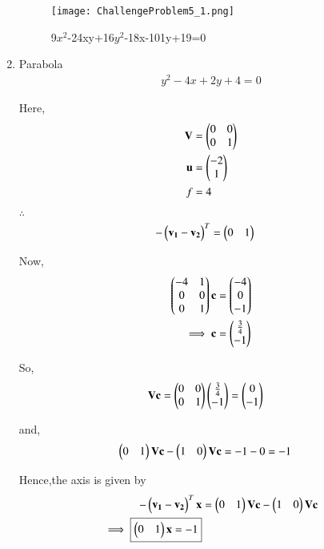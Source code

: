 \documentclass[journal,12pt,twocolumn]{IEEEtran}
\begin{document}
\begin{enumerate}
    \begin{figure}[!ht]
    \centering
    \texttt{[image: ChallengeProblem5\_1.png]}
    \caption{9$x^2$-24xy+16$y^2$-18x-101y+19=0}
    \label{ex1}	
    \end{figure}
    
    \item Parabola
    \begin{align}
    y^2-4x+2y+4 = 0
    \end{align}
    
    Here,
    \begin{align}
    \mathbf{V} &= \begin{pmatrix}0 & 0 \\ 0 & 1\end{pmatrix} \\
    \mathbf{u} &= \begin{pmatrix}-2 \\ 1\end{pmatrix} \\
    f &= 4
    \end{align}

    $\therefore$
    \begin{align}
    -\begin{pmatrix}\mathbf{v_1}-\mathbf{v_2}\end{pmatrix}^T &= \begin{pmatrix}0 & 1\end{pmatrix}
    \end{align}

    Now,
    \begin{align}
    \begin{pmatrix}-4 & 1 \\ 0 & 0 \\ 0 & 1\end{pmatrix}\mathbf{c} &= \begin{pmatrix}-4 \\ 0 \\ -1\end{pmatrix}
    \\
    \implies \mathbf{c} &= \begin{pmatrix}\frac{3}{4} \\ -1\end{pmatrix}
    \end{align}

    So,
    \begin{align}
    \mathbf{V}\mathbf{c} &= \begin{pmatrix}0 & 0 \\ 0 & 1\end{pmatrix}\begin{pmatrix}\frac{3}{4} \\ -1\end{pmatrix}=\begin{pmatrix}0 \\ -1\end{pmatrix}
    \end{align}

    and,
    \begin{align}
    \begin{pmatrix}0 & 1\end{pmatrix}\mathbf{V}\mathbf{c} - \begin{pmatrix}1&0\end{pmatrix}\mathbf{V}\mathbf{c} &= -1-0=-1
    \end{align}

    Hence,the axis is given by
    \begin{align}
    -\begin{pmatrix}\mathbf{v_1}-\mathbf{v_2}\end{pmatrix}^T\mathbf{x} &= \begin{pmatrix}0 & 1\end{pmatrix}\mathbf{V}\mathbf{c} - \begin{pmatrix}1 & 0\end{pmatrix}\mathbf{V}\mathbf{c} \\
    \implies \boxed{\begin{pmatrix}0 & 1\end{pmatrix}\mathbf{x} = -1}
    \end{align}
    

\end{enumerate}
\end{document}
